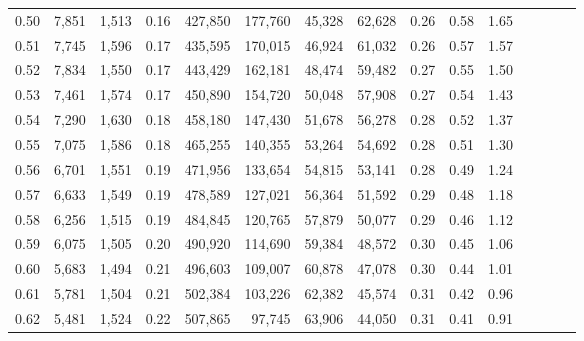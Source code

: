 \begin{tabular}{rrrcrrrrrrrrrrr}
0.50 &   7,851 &  1,513 &                                       0.16 &  427,850 &  177,760 &   45,328 &   62,628 &  0.26 &  0.58 &                         1.65 \\
0.51 &   7,745 &  1,596 &                                       0.17 &  435,595 &  170,015 &   46,924 &   61,032 &  0.26 &  0.57 &                         1.57 \\
0.52 &   7,834 &  1,550 &                                       0.17 &  443,429 &  162,181 &   48,474 &   59,482 &  0.27 &  0.55 &                         1.50 \\
0.53 &   7,461 &  1,574 &                                       0.17 &  450,890 &  154,720 &   50,048 &   57,908 &  0.27 &  0.54 &                         1.43 \\
0.54 &   7,290 &  1,630 &                                       0.18 &  458,180 &  147,430 &   51,678 &   56,278 &  0.28 &  0.52 &                         1.37 \\
0.55 &   7,075 &  1,586 &                                       0.18 &  465,255 &  140,355 &   53,264 &   54,692 &  0.28 &  0.51 &                         1.30 \\
0.56 &   6,701 &  1,551 &                                       0.19 &  471,956 &  133,654 &   54,815 &   53,141 &  0.28 &  0.49 &                         1.24 \\
0.57 &   6,633 &  1,549 &                                       0.19 &  478,589 &  127,021 &   56,364 &   51,592 &  0.29 &  0.48 &                         1.18 \\
0.58 &   6,256 &  1,515 &                                       0.19 &  484,845 &  120,765 &   57,879 &   50,077 &  0.29 &  0.46 &                         1.12 \\
0.59 &   6,075 &  1,505 &                                       0.20 &  490,920 &  114,690 &   59,384 &   48,572 &  0.30 &  0.45 &                         1.06 \\
0.60 &   5,683 &  1,494 &                                       0.21 &  496,603 &  109,007 &   60,878 &   47,078 &  0.30 &  0.44 &                         1.01 \\
0.61 &   5,781 &  1,504 &                                       0.21 &  502,384 &  103,226 &   62,382 &   45,574 &  0.31 &  0.42 &                         0.96 \\
0.62 &   5,481 &  1,524 &                                       0.22 &  507,865 &   97,745 &   63,906 &   44,050 &  0.31 &  0.41 &                         0.91 \\

\end{tabular}
